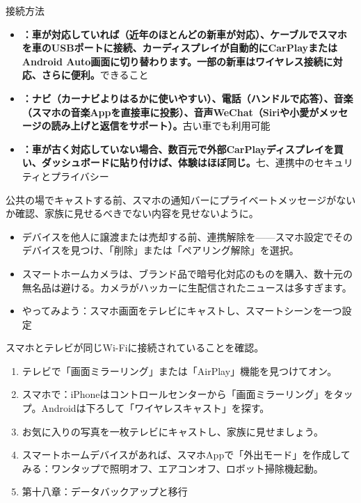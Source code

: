 
接続方法

\begin{itemize}
  \item \textbf{：車が対応していれば（近年のほとんどの新車が対応）、ケーブルでスマホを車のUSBポートに接続、カーディスプレイが自動的にCarPlayまたはAndroid Auto画面に切り替わります。一部の新車はワイヤレス接続に対応、さらに便利。}できること
  \item \textbf{：ナビ（カーナビよりはるかに使いやすい）、電話（ハンドルで応答）、音楽（スマホの音楽Appを直接車に投影）、音声WeChat（Siriや小愛がメッセージの読み上げと返信をサポート）。}古い車でも利用可能
  \item \textbf{：車が古く対応していない場合、数百元で外部CarPlayディスプレイを買い、ダッシュボードに貼り付けば、体験はほぼ同じ。}七、連携中のセキュリティとプライバシー
\end{itemize}


公共の場でキャストする前、スマホの通知バーにプライベートメッセージがないか確認、家族に見せるべきでない内容を見せないように。

\begin{itemize}
  \item デバイスを他人に譲渡または売却する前、連携解除を——スマホ設定でそのデバイスを見つけ、「削除」または「ペアリング解除」を選択。
  \item スマートホームカメラは、ブランド品で暗号化対応のものを購入、数十元の無名品は避ける。カメラがハッカーに生配信されたニュースは多すぎます。
  \item やってみよう：スマホ画面をテレビにキャストし、スマートシーンを一つ設定
\end{itemize}

\begin{tcbpractice}{スマホとテレビが同じWi-Fiに接続されていることを確認。}
\begin{enumerate}
  \item テレビで「画面ミラーリング」または「AirPlay」機能を見つけてオン。
  \item スマホで：iPhoneはコントロールセンターから「画面ミラーリング」をタップ。Androidは下ろして「ワイヤレスキャスト」を探す。
  \item お気に入りの写真を一枚テレビにキャストし、家族に見せましょう。
  \item スマートホームデバイスがあれば、スマホAppで「外出モード」を作成してみる：ワンタップで照明オフ、エアコンオフ、ロボット掃除機起動。
  \item 第十八章：データバックアップと移行
\end{enumerate}

\end{tcbpractice}

